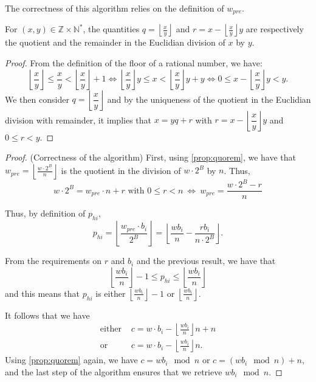 \documentclass[a4paper]{article}
\begin{document}
The correctness of this algorithm relies on the definition of $w_{pre}$. 

\begin{proposition}\label{prop:quorem}
For $(x,y) \in \mathbb{Z}\times \mathbb{N}^*$, the quantities $q=\left\lfloor\frac{x}{y}\right\rfloor$ and 
$r=x - \left\lfloor\frac{x}{y}\right\rfloor y$ are respectively the quotient and the remainder in the Euclidian division of $x$ by $y$.
\end{proposition}
    
\begin{proof}
From the definition of the floor of a rational number, we have:
\[
    \left\lfloor\dfrac{x}{y}\right\rfloor \leq \dfrac{x}{y} < \left\lfloor\dfrac{x}{y}\right\rfloor + 1 \Longleftrightarrow
    \left\lfloor\dfrac{x}{y}\right\rfloor y \leq x < \left\lfloor\dfrac{x}{y}\right\rfloor y + y \Longleftrightarrow
    0 \leq x - \left\lfloor\dfrac{x}{y}\right\rfloor y < y.
\]
We then consider $q=\left\lfloor\dfrac{x}{y}\right\rfloor$ and by the uniqueness of the quotient in the Euclidian division with remainder, 
it implies that $x = yq + r$ with $r=x - \left\lfloor\dfrac{x}{y}\right\rfloor y$ and $0 \leq r < y$.
\end{proof}

\begin{proof} (Correctness of the algorithm)
First, using \autoref{prop:quorem}, we have that $w_{pre}= \left\lfloor\frac{w\cdot 2^B}{n}\right\rfloor $ is the quotient in the division 
of $w\cdot 2^B$ by $n$. Thus,
\[
    w\cdot 2^B = w_{pre}\cdot n + r \text{ with } 0 \leq r < n\ \Longleftrightarrow\ w_{pre} = \dfrac{w\cdot 2^B - r}{n}
\]

Thus, by definition of $p_{hi}$,
\[
p_{hi} = \left\lfloor\frac{w_{pre}\cdot b_i}{2^B}\right\rfloor
= \left\lfloor\dfrac{wb_i}{n} - \dfrac{rb_i}{n\cdot 2^B} \right\rfloor.
\]

From the requirements on $r$ and $b_i$ and the previous result, we have that
\[
\left\lfloor\dfrac{wb_i}{n}\right\rfloor - 1 \leq p_{hi} \leq \left\lfloor\dfrac{wb_i}{n}\right\rfloor
\]
and this means that $p_{hi}$ is either $\left\lfloor\frac{wb_i}{n}\right\rfloor - 1$ or $\left\lfloor\frac{wb_i}{n}\right\rfloor$.


It follows that we have
\begin{align*}
\text{either } &c=w\cdot b_i - \left\lfloor\frac{wb_i}{n}\right\rfloor n + n \\
\text{or } &c=w\cdot b_i - \left\lfloor\frac{wb_i}{n}\right\rfloor n.
\end{align*}
Using \autoref{prop:quorem} again, we have $c=wb_i \mod n$ or $c=(wb_i \mod n)+n$, and the last step of the algorithm ensures 
that we retrieve $wb_i \mod n$.
\end{proof}
\end{document}
